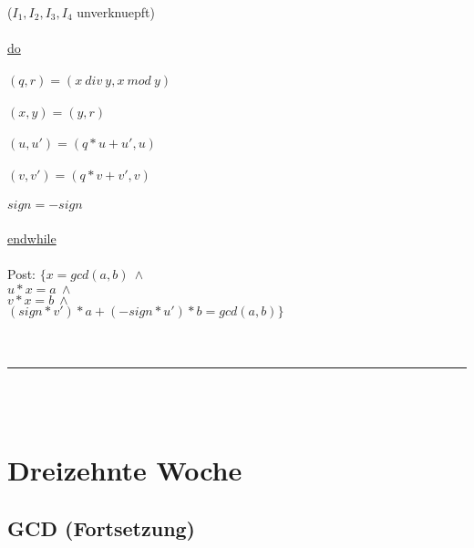 \documentclass[18pt,a4paper]{article}
\newcommand{\tab}{\hspace*{2em}}
\begin{document}
\\
\tab \tab($I_1, I_2, I_3, I_4$ unverknuepft)\\
\\
\uline{do}\\
\\
\tab$(q,r) = (x\: div \:y, x\: mod\: y)$\\
\\
\tab$(x,y) = (y,r)$\\
\\
\tab$(u,u') = (q*u + u', u)$\\
\\
\tab$(v,v') = (q*v + v', v)$\\
\\
\tab$sign = -sign$\\
\\
\uline{endwhile}\\
\\
Post: $\{ x = gcd(a,b)\: \wedge $\\
\tab $u*x = a\: \wedge$\\
\tab $v*x = b\: \wedge$\\
\tab $(sign *v')*a + (-sign*u')*b  = gcd(a,b) \}$\\
\\
\\
\rule{\textwidth}{0.4mm}\\
\\

\section{Dreizehnte Woche}

\subsection{GCD (Fortsetzung)}
\end{document}
